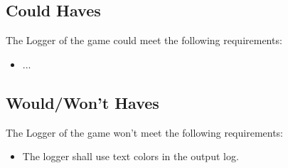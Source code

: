 \documentclass[10pt]{article}
\begin{document}
\subsection*{Could Haves}
The Logger of the game could meet the following requirements:
\begin{itemize}
	\item ...
\end{itemize}

\subsection*{Would/Won't Haves}
The Logger of the game won't meet the following requirements:
\begin{itemize}
	\item The logger shall use text colors in the output log.
\end{itemize}
\end{document}
